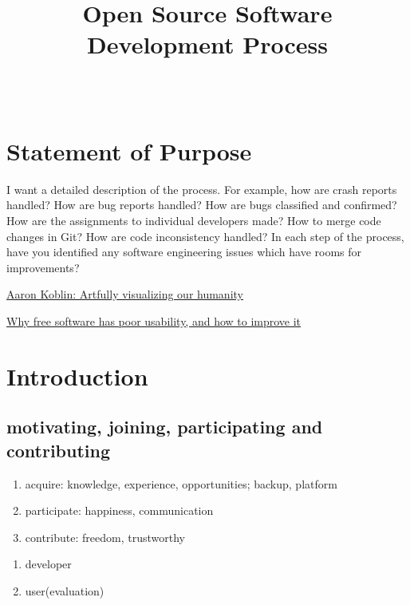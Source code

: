 \documentclass[draftclsnofoot,journal,onecolumn,12pt]{IEEEtran}
\begin{document}
\title{Open Source Software Development Process}

\author{ \\
}

\maketitle
%


\section{Statement of Purpose}
I want a detailed description of the process. For example, how are crash reports handled? How are bug reports handled? How are bugs classified and confirmed? How are the assignments to individual developers made? How to merge code changes in Git? How are code inconsistency handled? In each step of the process, have you identified any software engineering issues which have rooms for improvements?

\href{http://www.ted.com/talks/aaron_koblin.html}{Aaron Koblin: Artfully visualizing our humanity}

\href{http://www.mpt.net.nz/2012/06/why-free-software-has-poor-usability/}{Why free software has poor usability, and how to improve it}

\section{Introduction}

\subsection{motivating, joining, participating and contributing}

\begin{enumerate}
  \item acquire: knowledge, experience, opportunities; backup, platform
  \item participate: happiness, communication
  \item contribute: freedom, trustworthy
\end{enumerate}

\begin{enumerate}
  \item developer
  \item user(evaluation)
\end{enumerate}
\end{document}
